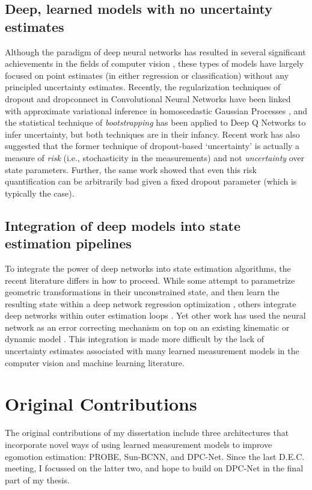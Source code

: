 \subsection{Deep, learned models with no uncertainty estimates}
Although the paradigm of deep neural networks has resulted in several significant achievements in the fields of computer vision \citep{LeCun2015-qf}, these types of models have largely focused on point estimates (in either regression or classification) without any principled uncertainty estimates. Recently, the regularization techniques of dropout and dropconnect in Convolutional Neural Networks have been linked with approximate variational inference in homoscedastic Gaussian Processes \citep{Gal2015-bf, Kendall2016-zf, McClure2016-ai}, and the statistical technique of \textit{bootstrapping} has been applied to Deep Q Networks \citep{Osband2016-jg} to infer uncertainty, but both techniques are in their infancy. Recent work \citep{Osband_undated-wl} has also suggested that the former technique of dropout-based `uncertainty' is actually a measure of \textit{risk} (i.e., stochasticity in the measurements) and not \textit{uncertainty} over state parameters. Further, the same work showed that even this risk quantification can be arbitrarily bad given a fixed dropout parameter (which is typically the case).

\subsection{Integration of deep models into state estimation pipelines}
 To integrate the power of deep networks into state estimation algorithms, the recent literature differs in how to proceed. While some attempt to parametrize geometric transformations in their unconstrained state, and then learn the resulting state within a deep network regression optimization \citep{Costante2016-hb, Kendall2015-kh}, others integrate deep networks within outer estimation loops \citep{Haarnoja2016-ph}. Yet other work has used the neural network as an error correcting mechanism on top on an existing kinematic or dynamic model \citep{Punjani2015-pj}. This integration is made more difficult by the lack of uncertainty estimates associated with many learned measurement models in the computer vision and machine learning literature.
 
 
 \section{Original Contributions}
The original contributions of my dissertation include three architectures that incorporate novel ways of using learned measurement models to improve egomotion estimation: PROBE, Sun-BCNN, and DPC-Net. Since the last D.E.C. meeting, I focussed on the latter two, and hope to build on DPC-Net in the final part of my thesis.

